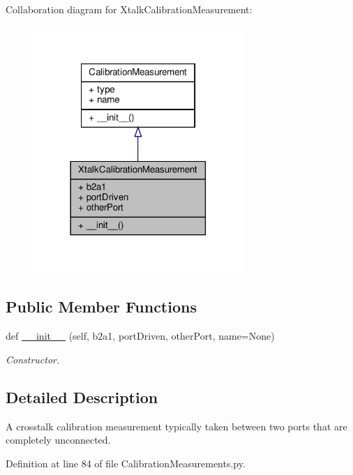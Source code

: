 Collaboration diagram for Xtalk\+Calibration\+Measurement\+:\nopagebreak
\begin{figure}[H]
\begin{center}
\leavevmode
\includegraphics[width=225pt]{classSignalIntegrity_1_1Measurement_1_1Calibration_1_1CalibrationMeasurements_1_1XtalkCalibrationMeasurement__coll__graph}
\end{center}
\end{figure}
\subsection*{Public Member Functions}
\begin{DoxyCompactItemize}
\item 
def \hyperlink{classSignalIntegrity_1_1Measurement_1_1Calibration_1_1CalibrationMeasurements_1_1XtalkCalibrationMeasurement_aaea55d844f39221cb8663d6ef54a507d}{\+\_\+\+\_\+init\+\_\+\+\_\+} (self, b2a1, port\+Driven, other\+Port, name=None)
\begin{DoxyCompactList}\small\item\em Constructor. \end{DoxyCompactList}\end{DoxyCompactItemize}


\subsection{Detailed Description}
A crosstalk calibration measurement typically taken between two ports that are completely unconnected. 



Definition at line 84 of file Calibration\+Measurements.\+py.



